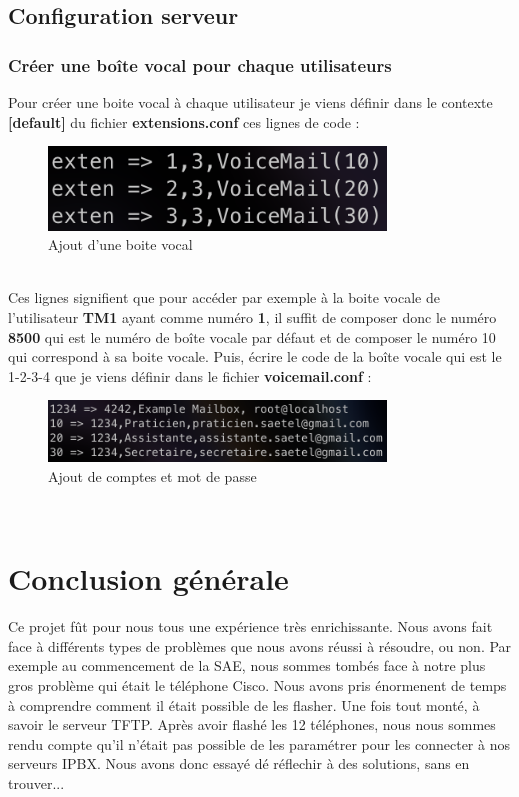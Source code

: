 \documentclass[12pt, a4paper]{article}
\begin{document}
	\subsection{Configuration serveur}
		\subsubsection{Créer une boîte vocal pour chaque utilisateurs}
		Pour créer une boite vocal à chaque utilisateur je viens définir 
		dans le contexte \textbf{[default]} du fichier \textbf{extensions.conf}
		ces lignes de code : 
		\begin{figure}[h]
			\centering
			\includegraphics[width=0.8\textwidth]{img/cont.png}
			\caption{Ajout d'une boite vocal}
			\label{fig:cont}
		\end{figure}\\
		Ces lignes signifient que pour accéder par exemple à la boite vocale
		de l'utilisateur \textbf{TM1} ayant comme numéro \textbf{1}, il suffit
		de composer donc le numéro \textbf{8500} qui est le numéro de boîte vocale
		par défaut et de composer le numéro 10 qui correspond à sa boite vocale. 
		Puis, écrire le code de la boîte vocale qui est le 1-2-3-4 que je viens
		définir dans le fichier \textbf{voicemail.conf} :\\
		\begin{figure}[h]
			\centering
			\includegraphics[width=0.8\textwidth]{img/voic.png}
			\caption{Ajout de comptes et mot de passe}
			\label{fig:voic}
		\end{figure}\\

\newpage
\section{Conclusion générale}
Ce projet fût pour nous tous une expérience très enrichissante. Nous avons
fait face à différents types de problèmes que nous avons réussi à résoudre, 
ou non. Par exemple au commencement de la SAE, nous sommes tombés face à 
notre plus gros problème qui était le téléphone Cisco. Nous avons pris énormenent
de temps à comprendre comment il était possible de les flasher. Une fois 
tout monté, à savoir le serveur TFTP. Après avoir flashé les 12 téléphones, 
nous nous sommes rendu compte qu'il n'était pas possible de les paramétrer 
pour les connecter à nos serveurs IPBX. Nous avons donc essayé dé réflechir
à des solutions, sans en trouver...\\
\end{document}

